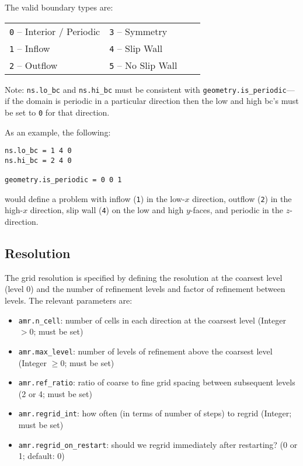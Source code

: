 The valid boundary types are:
\begin{table*}[h]
\begin{center}
\begin{tabular}{llll} 
{\tt 0} --  Interior / Periodic \hspace{1.in} & {\tt 3}  --  Symmetry     \hspace{1.in} & \\
{\tt 1} --  Inflow              \hspace{1.in} & {\tt 4}  --  Slip Wall    \hspace{1.in}& \\
{\tt 2} --  Outflow             \hspace{1.in} & {\tt 5}  --  No Slip Wall \hspace{1.in}& \\
\end{tabular}
\end{center}
\end{table*}

\noindent Note: {\tt ns.lo\_bc} and {\tt ns.hi\_bc} must be consistent with 
{\tt geometry.is\_periodic}---if the domain is periodic in a particular
direction then the low and high bc's must be set to {\tt 0} for that direction.

As an example, the following:
\begin{lstlisting}
ns.lo_bc = 1 4 0 
ns.hi_bc = 2 4 0 

geometry.is_periodic = 0 0 1
\end{lstlisting}
would define a problem with inflow ({\tt 1}) in the low-$x$ direction,
outflow ({\tt 2}) in the high-$x$ direction, slip wall ({\tt 4}) on
the low and high $y$-faces, and periodic in the $z$-direction.

\subsection{Resolution}

The grid resolution is specified by defining the resolution at the
coarsest level (level 0) and the number of refinement levels and
factor of refinement between levels.  The relevant parameters are:
\begin{itemize}
\item {\tt amr.n\_cell}:  number of cells in each direction at the coarsest level (Integer $> 0$; must be set)

\item {\tt amr.max\_level}:  number of levels of refinement above the coarsest level (Integer $\geq 0$; must be set)

\item {\tt amr.ref\_ratio}: ratio of coarse to fine grid spacing between subsequent levels (2 or 4; must be set)

\item {\tt amr.regrid\_int}: how often (in terms of number of steps) to regrid (Integer; must be set)

\item {\tt amr.regrid\_on\_restart}: should we regrid immediately after restarting? (0 or 1; default: 0)
\end{itemize}

